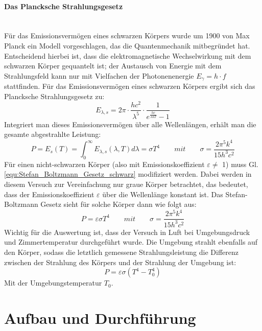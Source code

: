 \documentclass[12pt,a4paper]{article}
\begin{document}
\paragraph{Das Plancksche Strahlungsgesetz}\mbox{}\\
Für das Emissionsvermögen eines schwarzen Körpers wurde um 1900 von Max Planck ein Modell vorgeschlagen, das die Quantenmechanik mitbegründet hat. Entscheidend hierbei ist, dass die elektromagnetische Wechselwirkung mit dem schwarzen Körper gequantelt ist; der Austausch von Energie mit dem Strahlungsfeld kann nur mit Vielfachen der Photonenenergie $E_\gamma = h \cdot f$ stattfinden. Für das Emissionsvermögen eines schwarzen Körpers ergibt sich das Plancksche Strahlungsgesetz zu:
\begin{equation}
E_{\lambda, s} = 2 \pi \cdot \dfrac{h c^2}{\lambda^5} \cdot \dfrac{1}{e^{\frac{hc}{\lambda kT}} - 1}
\end{equation}
Integriert man dieses Emissionsvermögen über alle Wellenlängen, erhält man die gesamte abgestrahlte Leistung:
\begin{equation}
P = E_s (T) = \int_0^\infty E_{\lambda, s} (\lambda, T) d\lambda = \sigma T^4 \qquad mit \qquad \sigma = \dfrac{2 \pi^5 k^4}{15h^3c^2}
\label{equ:Stefan_Boltzmann_Gesetz_schwarz}
\end{equation}
Für einen nicht-schwarzen Körper (also mit Emissionskoeffizient $\varepsilon \neq$ 1) muss Gl. \ref{equ:Stefan_Boltzmann_Gesetz_schwarz} modifiziert werden. Dabei werden in diesem Versuch zur Vereinfachung nur graue Körper betrachtet, das bedeutet, dass der Emissionskoeffizient $\varepsilon$ über die Wellenlänge konstant ist. Das Stefan-Boltzmann Gesetz sieht für solche Körper dann wie folgt aus:
\begin{equation}
P = \varepsilon \sigma T^4 \qquad mit \qquad \sigma = \dfrac{2 \pi^5 k^4}{15h^3c^2}
\label{equ:Stefan_Boltzmann_Gesetz_grau}
\end{equation}
Wichtig für die Auswertung ist, dass der Versuch in Luft bei Umgebungsdruck und Zimmertemperatur durchgeführt wurde. Die Umgebung strahlt ebenfalls auf den Körper, sodass die letztlich gemessene Strahlungsleistung die Differenz zwischen der Strahlung des Körpers und der Strahlung der Umgebung ist:
\begin{equation}
P = \varepsilon \sigma (T^4 - T_0^4)
\label{equ:Stefan_Boltzmann_Gesetz_gemessen}
\end{equation}
Mit der Umgebungstemperatur $T_0$.



\section{Aufbau und Durchführung}
\end{document}
